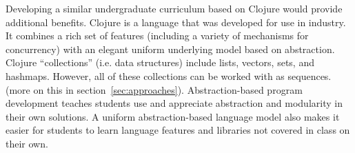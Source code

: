 \documentclass[submission,copyright,creativecommons]{eptcs}
\newcommand{\allcomments}[1]{{#1}}
\newcommand{\elenacomment}[1]{{\bf \textcolor{ForestGreen}{\allcomments{{#1}}}}}
\newcommand{\stephencomment}[1]{{\bf \color{StephensBlue}{\allcomments{{#1}}}}} %
\newcommand{\joecomment}[1]{{\bf \color{JoesGold}{\allcomments{{#1}}}}}
\begin{document}
Developing a similar undergraduate curriculum based on Clojure would provide additional benefits. 
Clojure is a language that was 
developed for use in industry. It combines a rich set of features (including a variety of mechanisms for concurrency) with an elegant uniform underlying model based on abstraction. Clojure ``collections'' (i.e. data structures) include lists, vectors, sets, and hashmaps. However, 
all of these collections can be worked with as sequences. (more on this in section~\ref{sec:approaches}). 
Abstraction-based program development teaches students use and appreciate abstraction and modularity in their own solutions. A uniform abstraction-based language model also makes it easier for students to learn language features and libraries not covered in class on their own. 
\end{document}
